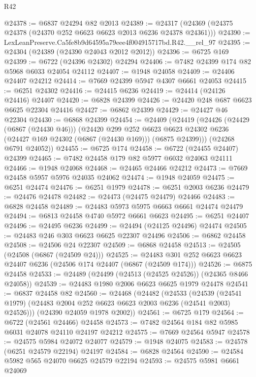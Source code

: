 \begin{lexlean}{R42}
\begin{coremodule}
{@24378 := @6837 @24294 @82 @2013
@24389 := @24317 (@24369 (@24375 @24378 (@24370 @252 @6623 @6623 @2013 @6236 @24378 @24361)))
@24390 := LexLeanPreserve.Ca5fe8b9d64595a79eee4f004915717bd.R42.__rel_97
@24395 := @24304 (@24389 (@24390 @24043 @2012 @2012))
@24396 := @6725 @169
@24399 := @6722 (@24396 @24302) @24294
@24406 := @7482 @24399 @174 @82 @5968 @6033 @24054 @24112
@24407 := @1948 @24058
@24409 := @24406 @24407 @24212
@24414 := @7669 @24399 @5947 @4307 @6661 @24053
@24415 := @6251 @24302
@24416 := @24415 @6236
@24419 := @24414 (@24126 @24416) @24407
@24420 := @6828 @24399
@24426 := @24420 @248 @687 @6623 @6625 @22304 @24416
@24427 := @6862 @24399
@24429 := @24427 @46 @22304
@24430 := @6868 @24399
@24454 := @24409
    (@24419
      (@24426
        (@24429 (@6867 (@24430 @46)))
        (@24420
          @299
          @252
          @6623
          @6623
          @24302
          @6236
          (@24427 @169 @24302 (@6867 (@24430 @169)))
          (@6875 @24399)))
      (@24268 @6791 @24052))
@24455 := @6725 @174
@24458 := @6722 (@24455 @24407) @24399
@24465 := @7482 @24458 @179 @82 @5977 @6032 @24063 @24111
@24466 := @1948 @24068
@24468 := @24465 @24466 @24212
@24473 := @7669 @24458 @5957 @5976 @24035 @24062
@24474 := @1948 @24059
@24475 := @6251 @24474
@24476 := @6251 @1979
@24478 := @6251 @2003 @6236
@24479 := @24476 @24478
@24482 := @24473 (@24475 @24479) @24466
@24483 := @6828 @24458
@24489 := @24483 @5973 @5975 @6663 @6661 @24474 @24479
@24494 := @6813 @24458 @4740 @5972 @6661 @6623
@24495 := @6251 @24407
@24496 := @24495 @6236
@24499 := @24494 (@24125 @24496) @24474
@24505 := @24483 @246 @303 @6623 @6625 @22307 @24496
@24506 := @6862 @24458
@24508 := @24506 @24 @22307
@24509 := @6868 @24458
@24513 := @24505 (@24508 (@6867 (@24509 @24)))
@24525 := @24483 @301 @252 @6623 @6623 @24407 @6236 (@24506 @174 @24407 (@6867 (@24509 @174)))
@24526 := @6875 @24458
@24533 := @24489 (@24499 (@24513 (@24525 @24526)) (@24365 @8466 @24058))
@24539 := @24483 @1980 @2006 @6623 @6625 @1979 @24478
@24541 := @6837 @24458 @82
@24560 := @24468
    (@24482
      (@24533
        (@24539 (@24541 @1979) (@24483 @2004 @252 @6623 @6623 @2003 @6236 (@24541 @2003) @24526)))
      (@24390 @24059 @1978 @2002))
@24561 := @6725 @179
@24564 := @6722 (@24561 @24466) @24458
@24573 := @7482 @24564 @184 @82 @5985 @6031 @24078 @24110 @24197 @24212
@24575 := @7669 @24564 @5947
@24578 := @24575 @5984 @24072 @24077
@24579 := @1948 @24075
@24583 := @24578 (@6251 @24579 @22194) @24197
@24584 := @6828 @24564
@24590 := @24584 @5982 @565 @24070 @6625 @24579 @22194
@24593 := @24575 @5981 @6661 @24069
}
\end{coremodule}
\end{lexlean}
